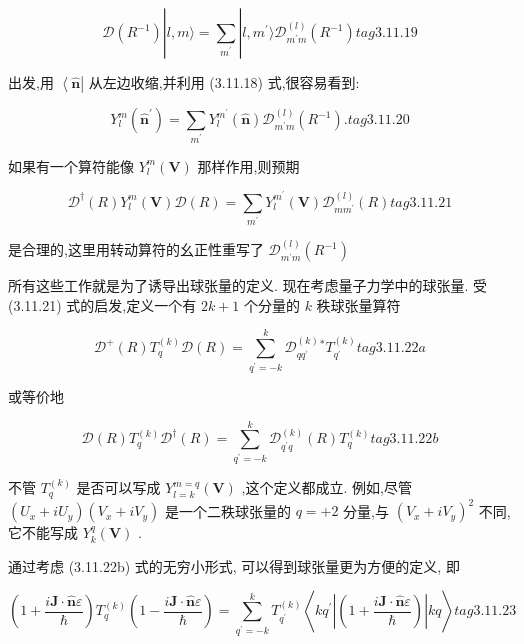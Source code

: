 $$
\mathcal{D}\left( {R}^{-1}\right) \left| {l, m\rangle = \mathop{\sum }\limits_{{m}^{\prime }}}\right| l,{m}^{\prime }\rangle {\mathcal{D}}_{{m}^{\prime }m}^{\left( l\right) }\left( {R}^{-1}\right) tag{3.11.19}
$$

出发,用 $\left\langle \widehat{\mathbf{n}}\right|$ 从左边收缩,并利用 (3.11.18) 式,很容易看到:

$$
{Y}_{l}^{m}\left( {\widehat{\mathbf{n}}}^{\prime }\right) = \mathop{\sum }\limits_{{m}^{\prime }}{Y}_{l}^{{m}^{\prime }}\left( \widehat{\mathbf{n}}\right) {\mathcal{D}}_{{m}^{\prime }m}^{\left( l\right) }\left( {R}^{-1}\right) . tag{3.11.20}
$$

如果有一个算符能像 ${Y}_{l}^{m}\left( \mathbf{V}\right)$ 那样作用,则预期

$$
{\mathcal{D}}^{ \dagger }\left( R\right) {Y}_{l}^{m}\left( \mathbf{V}\right) \mathcal{D}\left( R\right) = \mathop{\sum }\limits_{{m}^{\prime }}{Y}_{l}^{{m}^{\prime }}\left( \mathbf{V}\right) {\mathcal{D}}_{m{m}^{\prime }}^{\left( l\right) }\left( R\right) tag{3.11.21}
$$

是合理的,这里用转动算符的幺正性重写了 ${\mathcal{D}}_{{m}^{\prime }m}^{\left( l\right) }\left( {R}^{-1}\right)$

所有这些工作就是为了诱导出球张量的定义. 现在考虑量子力学中的球张量. 受 (3.11.21) 式的启发,定义一个有 ${2k} + 1$ 个分量的 $k$ 秩球张量算符

$$
{\mathcal{D}}^{ + }\left( R\right) {T}_{q}^{\left( k\right) }\mathcal{D}\left( R\right) = \mathop{\sum }\limits_{{{q}^{\prime } = - k}}^{k}{\mathcal{D}}_{q{q}^{\prime }}^{\left( k\right) }{}^{ * }{T}_{{q}^{\prime }}^{\left( k\right) } tag{3.11.22a}
$$

或等价地

$$
\mathcal{D}\left( R\right) {T}_{q}^{\left( k\right) }{\mathcal{D}}^{ \dagger }\left( R\right) = \mathop{\sum }\limits_{{{q}^{\prime } = - k}}^{k}{\mathcal{D}}_{{q}^{\prime }q}^{\left( k\right) }\left( R\right) {T}_{q}^{\left( k\right) } tag{3.11.22b}
$$

不管 ${T}_{q}^{\left( k\right) }$ 是否可以写成 ${Y}_{l = k}^{m = q}\left( \mathbf{V}\right)$ ,这个定义都成立. 例如,尽管 $\left( {{U}_{x} + i{U}_{y}}\right) \left( {{V}_{x} + i{V}_{y}}\right)$ 是一个二秩球张量的 $q = + 2$ 分量,与 ${\left( {V}_{x} + i{V}_{y}\right) }^{2}$ 不同,它不能写成 ${Y}_{k}^{q}\left( \mathbf{V}\right)$ .

通过考虑 (3.11.22b) 式的无穷小形式, 可以得到球张量更为方便的定义, 即

$$
\left( {1 + \frac{i\mathbf{J} \cdot \widehat{\mathbf{n}}\varepsilon }{\hslash }}\right) {T}_{q}^{\left( k\right) }\left( {1 - \frac{i\mathbf{J} \cdot \widehat{\mathbf{n}}\varepsilon }{\hslash }}\right) = \mathop{\sum }\limits_{{{q}^{\prime } = - k}}^{k}{T}_{{q}^{\prime }}^{\left( k\right) }\left\langle {k{q}^{\prime }\left| \left( {1 + \frac{i\mathbf{J} \cdot \widehat{\mathbf{n}}\varepsilon }{\hslash }}\right) \right| {kq}}\right\rangle tag{3.11.23}
$$

